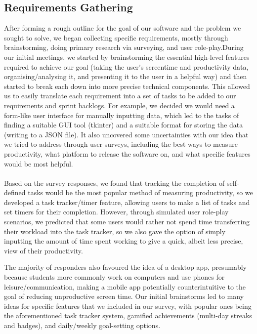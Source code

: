 \documentclass[12pt,a4paper]{article}
\begin{document}
\subsection{Requirements Gathering}
After forming a rough outline for the goal of our software and the problem we sought to solve, we began collecting specific requirements, mostly through brainstorming, doing primary research via surveying, and user role-play.During our initial meetings, we started by brainstorming the essential high-level features required to achieve our goal (taking the user’s screentime and productivity data, organising/analysing it, and presenting it to the user in a helpful way) and then started to break each down into more precise technical components. This allowed us to easily translate each requirement into a set of tasks to be added to our requirements and sprint backlogs. For example, we decided we would need a form-like user interface for manually inputting data, which led to the tasks of finding a suitable GUI tool (tkinter) and a suitable format for storing the data (writing to a JSON file). It also uncovered some uncertainties with our idea that we tried to address through user surveys, including the best ways to measure productivity, what platform to release the software on, and what specific features would be most helpful. 
\\
\\
Based on the survey responses, we found that tracking the completion of self-defined tasks would be the most popular method of measuring productivity, so we developed a task tracker/timer feature, allowing users to make a list of tasks and set timers for their completion. However, through simulated user role-play scenarios, we predicted that some users would rather not spend time transferring their workload into the task tracker, so we also gave the option of simply inputting the amount of time spent working to give a quick, albeit less precise, view of their productivity. 

The majority of responders also favoured the idea of a desktop app, presumably because students more commonly work on computers and use phones for leisure/communication, making a mobile app potentially counterintuitive to the goal of reducing unproductive screen time. Our initial brainstorms led to many ideas for specific features that we included in our survey, with popular ones being the aforementioned task tracker system, gamified achievements (multi-day streaks and badges), and daily/weekly goal-setting options.
\end{document}
